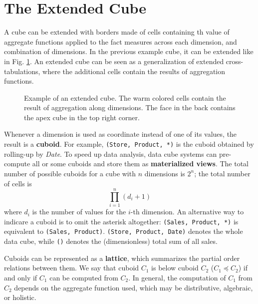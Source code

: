 \section{The Extended Cube}

A cube can be extended with borders made of cells containing th value of aggregate functions applied to the fact measures across each dimension, and combination of dimensions. In the previous example cube, it can be extended like in Fig. \ref{fig:cube_extended}. An extended cube can be seen as a generalization of extended cross-tabulations, where the additional cells contain the results of aggregation functions.
\begin{figure}[ht]
    \centering
    
    \caption{Example of an extended cube. The warm colored cells contain the result of aggregation along dimensions. The face in the back contains the apex cube in the top right corner.}
    \label{fig:cube_extended}
\end{figure}
Whenever a dimension is used as coordinate instead of one of its values, the result is a \textbf{cuboid}. For example, \texttt{(Store, Product, *)} is the cuboid obtained by rolling-up by \textit{Date}. To speed up data analysis, data cube systems can pre-compute all or some cuboids and store them as \textbf{materialized views}. The total number of possible cuboids for a cube with $n$ dimensions is $2^n$; the total number of cells is
\begin{equation*}
    \prod_{i=1}^n (d_i + 1)
\end{equation*}
where $d_i$ is the number of values for the $i$-th dimension. An alternative way to indicare a cuboid is to omit the asterisk altogether: \texttt{(Sales, Product, *)} is equivalent to \texttt{(Sales, Product)}. \texttt{(Store, Product, Date)} denotes the whole data cube, while \texttt{()} denotes the (dimensionless) total sum of all sales.

Cuboids can be represented as a \textbf{lattice}, which summarizes the partial order relations between them. We say that cuboid $C_1$ is below cuboid $C_2$ ($C_1 \preceq C_2$) if and only if $C_1$ can be computed from $C_2$. In general, the computation of $C_1$ from $C_2$ depends on the aggregate function used, which may be distributive, algebraic, or holistic.